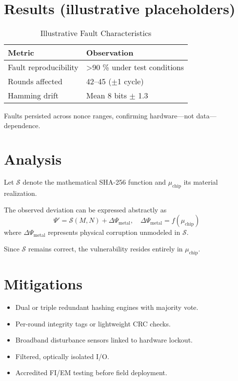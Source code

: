 \documentclass[11pt, a4paper]{article}
\begin{document}
\section{Results (illustrative placeholders)}
\begin{table}[h]
\centering
\caption{Illustrative Fault Characteristics}
\begin{tabular}{@{}ll@{}}
\toprule
\textbf{Metric} & \textbf{Observation} \\ \midrule
Fault reproducibility & >90 \% under test conditions \\
Rounds affected & 42--45 ($\pm$1 cycle) \\
Hamming drift & Mean 8 bits $\pm$ 1.3 \\\bottomrule
\end{tabular}
\end{table}

Faults persisted across nonce ranges, confirming hardware---not data---dependence.

\section{Analysis}
Let $\mathcal{S}$ denote the mathematical SHA-256 function and $\mu_{\text{chip}}$ its material realization.

The observed deviation can be expressed abstractly as
$$ \Psi' = \mathcal{S}(M,N) + \Delta\Psi_{\text{metal}},\quad \Delta\Psi_{\text{metal}}=f(\mu_{\text{chip}}) $$
where $\Delta\Psi_{\text{metal}}$ represents physical corruption unmodeled in $\mathcal{S}$.

Since $\mathcal{S}$ remains correct, the vulnerability resides entirely in $\mu_{\text{chip}}$.

\section{Mitigations}
\begin{itemize}
    \item Dual or triple redundant hashing engines with majority vote.
    \item Per-round integrity tags or lightweight CRC checks.
    \item Broadband disturbance sensors linked to hardware lockout.
    \item Filtered, optically isolated I/O.
    \item Accredited FI/EM testing before field deployment.
\end{itemize}
\end{document}
